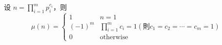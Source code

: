 设 $n=\prod_{i=1}^mp_i^{c_i}$，则
$$\mu(n)=\begin{cases}1&n=1\\(-1)^m&\prod\limits_{i=1}^mc_i=1(\text{則}c_1=c_2=\cdots=c_m=1)\\0&\text{otherwise}\end{cases}$$